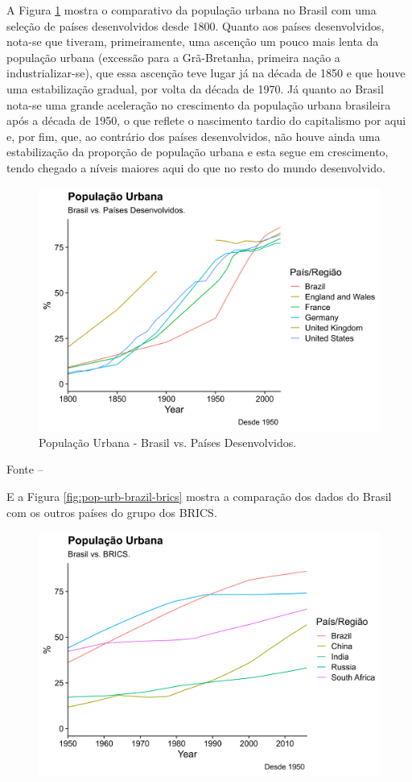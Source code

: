\documentclass[
	12pt,				%
	oneside,			%
	a4paper,			%
	chapter=TITLE,		%
	section=TITLE,		%
	english,			%
	brazil				%
	]{abntex2}
\newcommand{\bcenter}{\begin{center}}
\newcommand{\ecenter}{\end{center}}
\begin{document}
\begin{refsection}
A Figura \ref{fig:pop-urb-brazil-developed} mostra o comparativo da população
urbana no Brasil com uma seleção de países desenvolvidos desde 1800. Quanto aos
países desenvolvidos, nota-se que tiveram, primeiramente, uma ascenção um pouco
mais lenta da população urbana (excessão para a Grã-Bretanha, primeira nação a
industrializar-se), que essa ascenção teve lugar já na década de 1850 e que
houve uma estabilização gradual, por volta da década de 1970. Já quanto ao
Brasil nota-se uma grande aceleração no crescimento da população urbana
brasileira após a década de 1950, o que reflete o nascimento tardio do
capitalismo por aqui e, por fim, que, ao contrário dos países desenvolvidos, não
houve ainda uma estabilização da proporção de população urbana e esta segue em
crescimento, tendo chegado a níveis maiores aqui do que no resto do mundo
desenvolvido.
\begin{figure}[H]

{\centering \includegraphics[width=0.8\linewidth]{images/pop-urb-brazil-developed-1} 

}

\caption{População Urbana - Brasil vs. Países Desenvolvidos.}\label{fig:pop-urb-brazil-developed}
\end{figure}
\bcenter

\small Fonte -- \textcite{doi:10.1177/0959683609356587}
\ecenter

E a Figura \ref{fig:pop-urb-brazil-brics} mostra a comparação dos dados do
Brasil com os outros países do grupo dos \gls{BRICS}.
\begin{figure}[H]

{\centering \includegraphics[width=0.8\linewidth]{images/pop-urb-brazil-brics-1} 

}
\end{figure}
\end{refsection}
\end{document}

